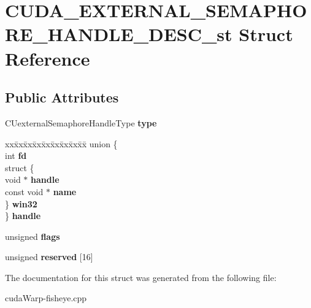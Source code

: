 \hypertarget{structCUDA__EXTERNAL__SEMAPHORE__HANDLE__DESC__st}{}\section{C\+U\+D\+A\+\_\+\+E\+X\+T\+E\+R\+N\+A\+L\+\_\+\+S\+E\+M\+A\+P\+H\+O\+R\+E\+\_\+\+H\+A\+N\+D\+L\+E\+\_\+\+D\+E\+S\+C\+\_\+st Struct Reference}
\label{structCUDA__EXTERNAL__SEMAPHORE__HANDLE__DESC__st}
\subsection*{Public Attributes}
\begin{DoxyCompactItemize}
\item 
C\+Uexternal\+Semaphore\+Handle\+Type {\bfseries type}\hypertarget{structCUDA__EXTERNAL__SEMAPHORE__HANDLE__DESC__st_ac2eb0656979babbe2f26af4d84f73012}{}\label{structCUDA__EXTERNAL__SEMAPHORE__HANDLE__DESC__st_ac2eb0656979babbe2f26af4d84f73012}

\item 
\begin{tabbing}
xx\=xx\=xx\=xx\=xx\=xx\=xx\=xx\=xx\=\kill
union \{\\
\>int {\bfseries fd}\\
\>struct \{\\
\>\>void $\ast$ {\bfseries handle}\\
\>\>const void $\ast$ {\bfseries name}\\
\>\} {\bfseries win32}\\
\} {\bfseries handle}\hypertarget{structCUDA__EXTERNAL__SEMAPHORE__HANDLE__DESC__st_adcc692d8dc9d6ed56a21f2506557a247}{}\label{structCUDA__EXTERNAL__SEMAPHORE__HANDLE__DESC__st_adcc692d8dc9d6ed56a21f2506557a247}
\\

\end{tabbing}\item 
unsigned {\bfseries flags}\hypertarget{structCUDA__EXTERNAL__SEMAPHORE__HANDLE__DESC__st_a06be913f9c8403dcf0e3a572258f8a86}{}\label{structCUDA__EXTERNAL__SEMAPHORE__HANDLE__DESC__st_a06be913f9c8403dcf0e3a572258f8a86}

\item 
unsigned {\bfseries reserved} \mbox{[}16\mbox{]}\hypertarget{structCUDA__EXTERNAL__SEMAPHORE__HANDLE__DESC__st_aa9ecf3385a384e9b42972c5e46636a45}{}\label{structCUDA__EXTERNAL__SEMAPHORE__HANDLE__DESC__st_aa9ecf3385a384e9b42972c5e46636a45}

\end{DoxyCompactItemize}


The documentation for this struct was generated from the following file\+:\begin{DoxyCompactItemize}
\item 
cuda\+Warp-\/fisheye.\+cpp\end{DoxyCompactItemize}
